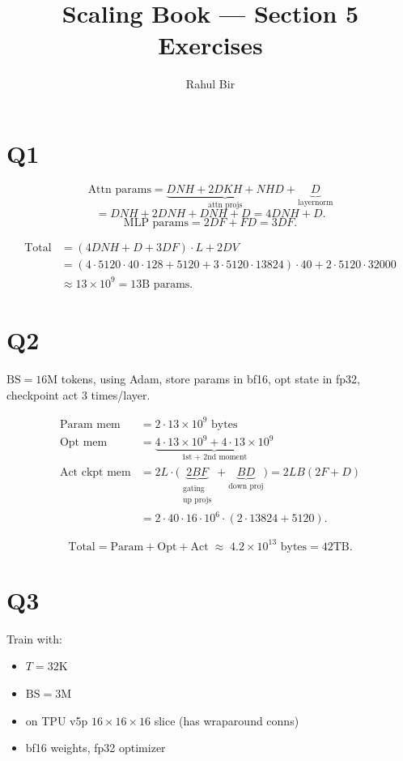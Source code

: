 \documentclass[11pt]{article}
\title{Scaling Book --- Section 5 Exercises}
\author{Rahul Bir}
\date{}
\begin{document}
\maketitle

\section*{Q1}

\[
\text{Attn params} = \underbrace{DNH + 2DKH + NHD}_{\text{attn projs}} + \underbrace{D}_{\text{layernorm}}
\]
\[
= DNH + 2DNH + DNH + D = 4DNH + D.
\]
\[
\text{MLP params} = 2DF + FD = 3DF.
\]

\begin{align*}
\text{Total} &= (4DNH + D + 3DF) \cdot L + 2DV \\
&= (4 \cdot 5120 \cdot 40 \cdot 128 + 5120 + 3 \cdot 5120 \cdot 13824) \cdot 40 + 2 \cdot 5120 \cdot 32000 \\
&\approx 13 \times 10^9 = 13\text{B params.}
\end{align*}

\section*{Q2}

$\text{BS} = 16$M tokens, using Adam, store params in bf16, opt state in fp32, checkpoint act 3 times/layer.

\begin{align*}
\text{Param mem} &= 2 \cdot 13 \times 10^9 \text{ bytes} \\
\text{Opt mem}   &= \underbrace{4 \cdot 13 \times 10^9 + 4 \cdot 13 \times 10^9}_{\text{1st + 2nd moment}} \\
\text{Act ckpt mem} &= 2L \cdot \big( \underbrace{2BF}_{\substack{\text{gating} \\ \text{up projs}}} + \underbrace{BD}_{\text{down proj}} \big) = 2LB(2F + D) \\
&= 2 \cdot 40 \cdot 16 \cdot 10^6 \cdot (2 \cdot 13824 + 5120).
\end{align*}

\[
\text{Total} = \text{Param} + \text{Opt} + \text{Act} \;\approx\; 4.2 \times 10^{13} \text{ bytes} = 42\text{TB}.
\]

\section*{Q3}

Train with:
\begin{itemize}[leftmargin=*]
  \item $T = 32$K
  \item $\text{BS} = 3$M
  \item on TPU v5p $16 \times 16 \times 16$ slice (has wraparound conns)
  \item bf16 weights, fp32 optimizer
\end{itemize}
\end{document}
